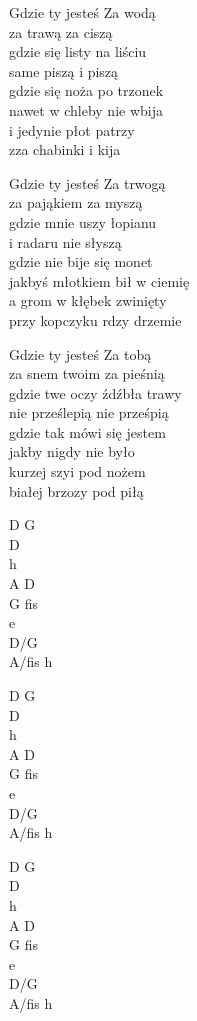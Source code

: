 \begin{text}
    Gdzie ty jesteś Za wodą\\
    za trawą za ciszą\\
    gdzie się listy na liściu\\
    same piszą i piszą\\
    gdzie się noża po trzonek\\
    nawet w chleby nie wbija\\
    i jedynie płot patrzy\\
    zza chabinki i kija

    Gdzie ty jesteś Za trwogą\\
    za pająkiem za myszą\\
    gdzie mnie uszy łopianu\\
    i radaru nie słyszą\\
    gdzie nie bije się monet\\
    jakbyś młotkiem bił w ciemię\\
    a grom w kłębek zwinięty\\
    przy kopczyku rdzy drzemie

    Gdzie ty jesteś Za tobą\\
    za snem twoim za pieśnią\\
    gdzie twe oczy źdźbła trawy\\
    nie prześlepią nie prześpią\\
    gdzie tak mówi się jestem\\
    jakby nigdy nie było\\
    kurzej szyi pod nożem\\
    białej brzozy pod piłą
\end{text}
\begin{chord}
    D G\\
    D\\
    h\\
    A D\\
    G fis\\
    e\\
    D/G\\
    A/fis h

    D G\\
    D\\
    h\\
    A D\\
    G fis\\
    e\\
    D/G\\
    A/fis h

    D G\\
    D\\
    h\\
    A D\\
    G fis\\
    e\\
    D/G\\
    A/fis h
\end{chord}